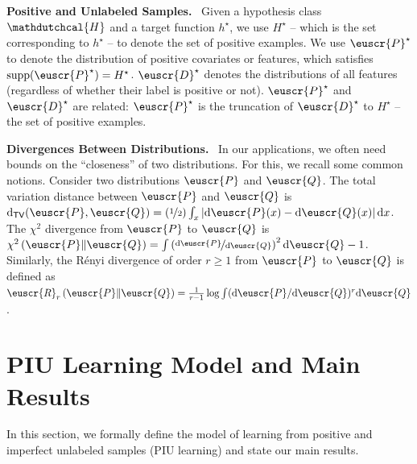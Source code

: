\documentclass[11pt]{article}
\theoremstyle{plain}
\theoremstyle{definition}
\theoremstyle{remark}
\def\abs#1{\left| #1 \right|}
\newcommand{\sinparen}[1]{(#1)}
\newcommand{\inparen}[1]{\left(#1\right)}
\newcommand{\tv}[2]{\operatorname{d}_{\mathsf{TV}}\sinparen{#1,#2}}
\newcommand{\chidiv}[2]{\chi^2\inparen{#1\|#2}}
\newcommand{\renyi}[3]{\cR_{#1}\inparen{#2\|#3}}
\newcommand{\sfrac}[2]{{#1/#2}}
\newcommand{\nfrac}[2]{\nicefrac{#1}{#2}}
\newcommand{\supp}{\operatorname{supp}}
\newcommand{\customcal}[1]{\euscr{#1}}
\newcommand{\cD}{\customcal{D}}
\newcommand{\cP}{\customcal{P}}
\newcommand{\cQ}{\customcal{Q}}
\newcommand{\cR}{\customcal{R}}
\renewcommand{\paragraph}[1]{\medskip \noindent\textbf{#1}~}
\newcommand{\hypo}[1]{\mathdutchcal{#1}}
\newcommand{\hyH}{\hypo{H}}
\renewcommand{\d}{{\rm d}}
\newcommand{\optset}{{H^\star}}
\newcommand{\cDtrue}{\cD^\star}
\newcommand{\cPtrue}{\cP^\star}
\newcommand{\hstar}{h^\star}
\begin{document}
    \paragraph{Positive and Unlabeled Samples.}
        Given a hypothesis class $\hyH$ and a target function $\hstar$, we use $\optset$ -- which is the set corresponding to $\hstar$ -- to denote the set of positive examples.
        We use $\cPtrue$ to denote the distribution of positive covariates or features, which satisfies $\supp(\cPtrue)=\optset$.
        $\cDtrue$ denotes the distributions of all features (regardless of whether their label is positive or not).
        $\cPtrue$ and $\cDtrue$ are related: $\cPtrue$ is the truncation of $\cDtrue$ to $\optset$ -- the set of positive examples.

    \paragraph{Divergences Between Distributions.}
        In our applications, we often need bounds on the ``closeness'' of two distributions.
        For this, we recall some common notions. 
        Consider two distributions $\cP$ and $\cQ$.
        The total variation distance between $\cP$ and $\cQ$ is $\tv{\cP}{\cQ}=\inparen{\nfrac{1}{2}}\int_{x}\abs{\d \cP(x)-\d \cQ(x)}\d x$.
        The $\chi^2$ divergence from $\cP$ to $\cQ$ is  $\chidiv{\cP}{\cQ}
        = \int \inparen{\nfrac{\d\cP}{\d\cQ}}^2 \d \cQ - 1$.
        Similarly, the Rényi divergence of order \(r \geq 1\) from \(\cP\) to \(\cQ\) is defined as $\renyi{r}{\cP}{\cQ} = \frac{1}{r - 1} \log \int (\sfrac{\d \cP}{\d \cQ})^r \d \cQ$.


     
 

\section{PIU Learning Model and Main Results}\label{sec:model_and_result}
    In this section, we formally define the model of learning from positive and imperfect unlabeled samples (PIU learning) and state our main results. 
\end{document}

